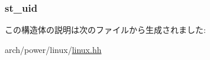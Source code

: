 \label{structPowerLinux_1_1tgt__stat64_ae9a97f03571901a066d512b87bc36dba}
\hypertarget{structPowerLinux_1_1tgt__stat64_ad5477a292a4edf27aa5766e01e0f5d1f}{
\subsubsection[{st\_\-uid}]{ {\bf st\_\-uid}}}
\label{structPowerLinux_1_1tgt__stat64_ad5477a292a4edf27aa5766e01e0f5d1f}


この構造体の説明は次のファイルから生成されました:\begin{DoxyCompactItemize}
\item 
arch/power/linux/\hyperlink{arch_2power_2linux_2linux_8hh}{linux.hh}\end{DoxyCompactItemize}
